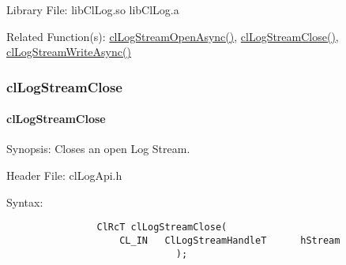 \begin{flushleft}
\begin{Desc}
\item[Library File:] 
libClLog.so
\newline
libClLog.a
\end{Desc}

\begin{Desc}
\item[Related Function(s):]\hyperlink{pagelog106}{clLogStreamOpenAsync()}, \hyperlink{pagelog108}{clLogStreamClose()}, 
\hyperlink{pagelog109}{clLogStreamWriteAsync()}\end{Desc}	
\newpage



\subsubsection{clLogStreamClose}
\hypertarget{pagelog108}{}\paragraph{cl\-Log\-Stream\-Close}\label{pagelog108}
\begin{Desc}
\item[Synopsis:]Closes an open Log Stream. \end{Desc}
\begin{Desc}
\item[Header File:] clLogApi.h \end{Desc}
\begin{Desc}
\item[Syntax:]
\footnotesize\begin{verbatim}        	
				ClRcT clLogStreamClose(
					CL_IN	ClLogStreamHandleT		hStream
						      );


\end{verbatim}
\end{Desc}
\end{flushleft}
